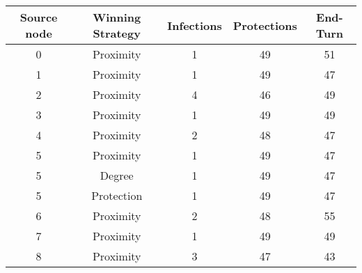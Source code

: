 \documentclass[results.tex]{subfiles}
\begin{document}
    \begin{center}
        \begin{tabular}{| c || c | c | c | c |}
            \hline
            {\bfseries Source node} & {\bfseries Winning Strategy} & {\bfseries Infections} & {\bfseries Protections}
            & {\bfseries End-Turn}
            \\  %
            \hline\hline
            0                       & Proximity                    & 1                      & 49                      & 51                   \\
            \hline
            1                       & Proximity                    & 1                      & 49                      & 47                   \\
            \hline
            2                       & Proximity                    & 4                      & 46                      & 49                   \\
            \hline
            3                       & Proximity                    & 1                      & 49                      & 49                   \\
            \hline
            4                       & Proximity                    & 2                      & 48                      & 47                   \\
            \hline
            5                       & Proximity                    & 1                      & 49                      & 47                   \\
            \hline
            5                       & Degree                       & 1                      & 49                      & 47                   \\
            \hline
            5                       & Protection                   & 1                      & 49                      & 47                   \\
            \hline
            6                       & Proximity                    & 2                      & 48                      & 55                   \\
            \hline
            7                       & Proximity                    & 1                      & 49                      & 49                   \\
            \hline
            8                       & Proximity                    & 3                      & 47                      & 43                   \\

\end{tabular}
\end{center}
\end{document}
